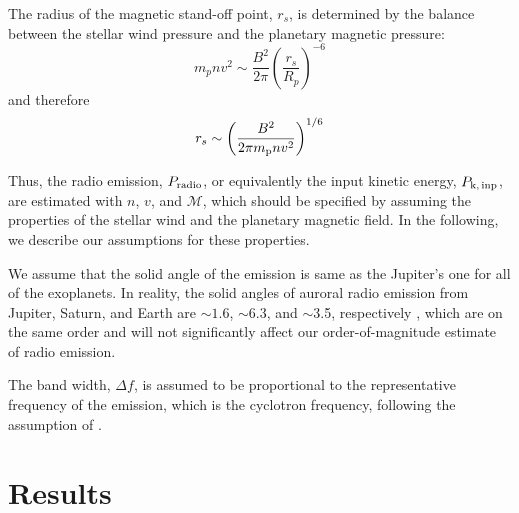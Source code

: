 \documentclass{emulateapj}
\begin{document}
The radius of the magnetic stand-off point, $r_s$, is determined by the balance between the stellar wind pressure and the planetary magnetic pressure: 
\begin{equation}
m_p n v ^2 \sim \frac{B^2}{2\pi}\left( \frac{r_s}{R_p} \right)^{-6}  \label{eq:stand-off}
\end{equation}
and therefore
\begin{equation}
r_s \sim \left( \frac{B^2}{2\pi m_{\rm p}nv^2}
\right)^{1/6}   \label{eq:stand-off-radius}
\end{equation}

Thus, the radio emission, $P_{\rm radio}$, or equivalently the input kinetic energy, $P_{\rm k,\,inp}$, are estimated with $n$, $v$, and $\mathcal{M}$, which should be specified by assuming the properties of the stellar wind and the planetary magnetic field. 
In the following, we describe our assumptions for these properties. 



We assume that the solid angle of the emission is same as the Jupiter's one for all of the exoplanets. In reality, the solid angles of auroral radio emission from  Jupiter, Saturn, and Earth are $\sim 1.6$, $\sim $6.3, and $\sim $3.5, respectively \citep{desch+kaiser1984}, which are on the same order and will not significantly affect our order-of-magnitude estimate of radio emission. 

The band width, $\Delta f$, is assumed to be proportional to the representative frequency of the emission, which is the cyclotron frequency, following the assumption of \citet{griebmeier2007}. 



\section{Results}
\label{s:result}
\end{document}

